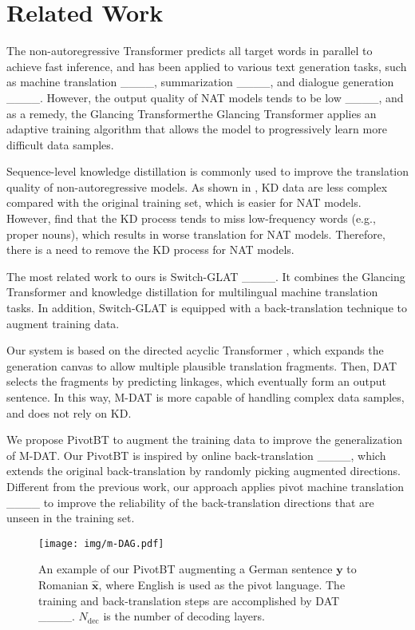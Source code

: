 \section{Related Work}
The non-autoregressive Transformer \cite[NAT,][]{gu2018nonautoregressive} predicts all target words in parallel to achieve fast inference, 
and has been applied to various text generation tasks, such as machine translation ____, summarization ____, and dialogue generation ____.
However, the output quality of NAT models tends to be low ____, and as a remedy, the Glancing Transformerthe Glancing Transformer \cite[GLAT,][]{qian-etal-2021-glancing} applies an adaptive training algorithm that allows the model to progressively learn more difficult data samples.

Sequence-level knowledge distillation \cite[KD,][]{kim-rush-2016-sequence} is commonly used to improve the translation quality of non-autoregressive models.
As shown in , KD data are less complex compared with the original training set, which is easier for NAT models. However,  find that the KD process tends to miss low-frequency words (e.g., proper nouns), which results in worse translation for NAT models. Therefore, there is a need to remove the KD process for NAT models.

The most related work to ours is Switch-GLAT ____. It combines the Glancing Transformer and knowledge distillation for multilingual machine translation tasks. In addition, Switch-GLAT is equipped with a back-translation technique to augment training data.  


Our system is based on the directed acyclic Transformer \cite[DAT,][]{dag},
which expands the generation canvas to allow multiple plausible translation fragments. Then, DAT selects the fragments by predicting linkages, which eventually form an output sentence. 
In this way, M-DAT is more capable of handling complex data samples, and does not rely on KD.

We propose PivotBT to augment the training data to improve the generalization of M-DAT. Our PivotBT is inspired by online back-translation ____, which extends the original back-translation \cite[BT,][]{bt} by randomly picking augmented directions. Different from the previous work, our approach applies pivot machine translation ____ to improve the reliability of the back-translation directions that are unseen in the training set.


\begin{figure}[t]
  \centering
  \texttt{[image: img/m-DAG.pdf]}
  \vspace{-0.5cm}
  \caption{An example of our PivotBT augmenting a German sentence $\mathbf y$ to Romanian $\hat{\mathbf{x}}$, where English is used as the pivot language. The training and back-translation steps are accomplished by DAT ____. 
  $N_{\text{dec}}$ is the number of decoding layers.}
  \label{fig:dat}
\end{figure}